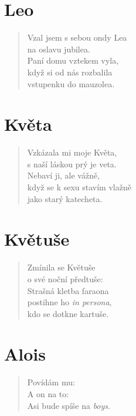 \section*{Leo}
\begin{verse}
Vzal jsem s sebou ondy Lea\\
na oslavu jubilea.\\
Paní domu vztekem vyla,\\
když si od nás rozbalila\\
vstupenku do mauzolea.
\end{verse}

\section*{Květa}
\begin{verse}
Vzkázala mi moje Květa,\\
s naší láskou prý je veta.\\
Nebaví ji, ale vážně,\\
když se k sexu stavím vlažně\\
jako starý katecheta.
\end{verse}

\section*{Květuše}
\begin{verse}
Zmínila se Květuše\\
o své noční předtuše:\\
Strašná kletba faraona\\
postihne ho \textit{in persona},\\
kdo se dotkne kartuše.
\end{verse}

\section*{Alois}
\begin{verse}
Povídám mu: \\
A on na to: \\
Asi bude spíše na \textit{boys}.
\end{verse}

